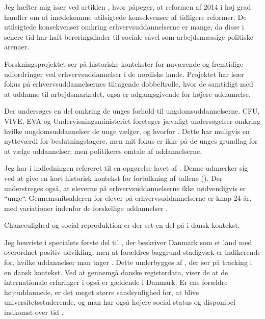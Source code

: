 Jeg hæfter mig især ved artiklen , hvor \citeauthor{jorgensenReformenAfErhvervsuddannelserne2016} påpeger, at reformen af 2014 i høj grad handler om at imødekomme utilsigtede konsekvenser af tidligere reformer.
De utilsigtede konsekvenser omkring erhvervsuddannelserne er mange, da disse i senere tid har haft berøringsflader til sociale såvel som arbejdsmæssige politiske arenaer.

Forskningsprojektet  ser på historiske kontekster for nuværende og fremtidige udfordringer ved erhvervsuddannelser i de nordiske lande.
Projektet har især fokus på erhvervsuddannelsernes tiltagende dobbeltrolle, hvor de samtidigt med at uddanne til arbejdsmarkedet, også er adgangsgivende for højere uddannelse.

Der undersøges en del omkring de unges forhold til ungdomsuddannelserne.
CFU, VIVE, EVA og Undervisningsministeriet foretager jævnligt undersøgelser omkring hvilke ungdomsuddannelser de unge vælger, og hvorfor \autocite[se fx.][]{undervisningsministerietOg10Klasseelevernes2017, borne-ogundervisningsministerietHvemOgHvor, danmarksstatistikErhvervsuddannelserDanmark20192019}.
Dette har muligvis en nytteværdi for beslutningstagere, men mit fokus er ikke på de unges grundlag for at vælge uddannelser; men politikeres omtale af uddannelserne.

Jeg har i indledningen refereret til en opgørelse lavet af \citeauthor{danmarksstatistikErhvervsuddannelserDanmark20192019}.
Denne udmærker sig ved at give en kort historisk kontekst for fortolkning af tallene (\citeyear[s. 8ff]{danmarksstatistikErhvervsuddannelserDanmark20192019}).
Der understreges også, at eleverne på erhvervsuddannelserne ikke nødvendigvis er “unge“.
Gennemsnitsalderen for elever på erhvervsuddannelserne er knap 24 år, med variationer indenfor de forskellige uddannelser \autocite[s. 14]{danmarksstatistikErhvervsuddannelserDanmark20192019}.

Chanceulighed og social reproduktion er der set en del på i dansk kontekst.

Jeg henviste i specialets første del til \citeauthor{munkSocialUlighedOg2014}, der beskriver Danmark som et land med overordnet positiv udvikling; men at forældres baggrund stadigvæk er indikerende for, hvilke uddannelser man tager \autocite{munkSocialUlighedOg2014}.
Dette underbygges af \citeauthor{felsbirkelundStructureCausesConsequencesInprogress}, der ser på tracking i en dansk kontekst.
Ved at gennemgå danske registerdata, viser de at de internationale erfaringer i også er gældende i Danmark.
Er ens forældre højtuddannede, er det meget større sandsynlighed for, at blive universitetsstuderende, og man har også højere social status og disponibel indkomst over tid \autocite{felsbirkelundStructureCausesConsequencesInprogress}.

